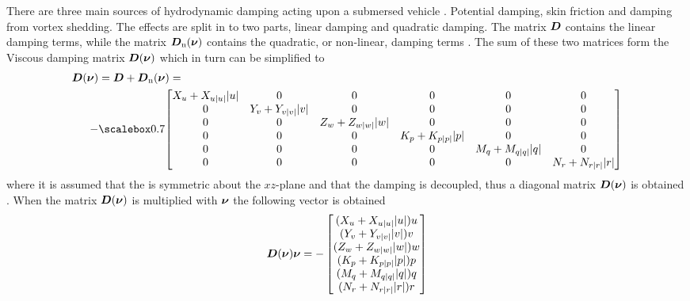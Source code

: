 There are three main sources of hydrodynamic damping acting upon a submersed vehicle \citep[p. 122]{fossen2011}.
Potential damping, skin friction and damping from vortex shedding. The effects are split in to two parts, linear damping and quadratic damping.
The matrix $\boldsymbol{D}$ contains the linear damping terms, while the matrix $\boldsymbol{D}_{\text{n}}(\boldsymbol{\nu})$ contains the quadratic, or non-linear, damping terms \citep{fossen2011}. The sum of these two matrices form the Viscous damping matrix $\boldsymbol{D}(\boldsymbol{\nu})$ which in turn can be simplified to
\begin{align}
\begin{split}
    \damping(\nuVector) &= \damping + \damping_{\text{n}}(\nuVector) = \\
    -& \scalemath{0.7}{\begin{bmatrix}
        \Xu+\Xuabsu\abs{u} & 0 & 0 & 0 & 0 & 0 \\
        0 & \Yv+\Yvabsv\abs{v} & 0 & 0 & 0 & 0 \\
        0 & 0 & \Zw+\Zwabsw\abs{w} & 0 & 0 & 0 \\
        0 & 0 & 0 & \Kp+\Kpabsp\abs{p} & 0 & 0 \\
        0 & 0 & 0 & 0 & \Mq+\Mqabsq\abs{q} & 0 \\
        0 & 0 & 0 & 0 & 0 & \Nr+\Nrabsr\abs{r} \\
    \end{bmatrix}}
    \end{split}
\end{align}
where it is assumed that the \abbrROV is symmetric about the $xz$-plane and that the damping is decoupled, thus a diagonal matrix $\boldsymbol{D}(\boldsymbol{\nu})$ is obtained \citep[p. 129]{fossen2011}. When the matrix $\boldsymbol{D}(\boldsymbol{\nu})$ is multiplied with $\boldsymbol{\nu}$ the following vector is obtained 
\begin{equation}
    \boldsymbol{D}(\boldsymbol{\nu}) \boldsymbol{\nu} =
     -\begin{bmatrix}
    (X_{u} + X_{u|u|} |u|) u\\
    (Y_{v} + Y_{v|v|} |v|) v\\
    (Z_{w} + Z_{w|w|} |w|) w\\
    (K_{p} + K_{p|p|} |p|) p\\
    (M_{q} + M_{q|q|} |q|) q\\
    (N_{r} + N_{r|r|} |r|) r\\
    \end{bmatrix}    
\end{equation}

